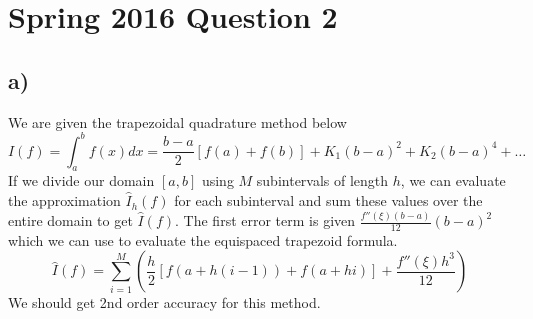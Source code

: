 \documentclass[12pt]{article}
\begin{document}
\section*{Spring 2016 Question 2}

\subsection*{a)} 
We are given the trapezoidal quadrature method below
\begin{equation*}
I(f) = \int_a^b f(x) dx = \dfrac{b-a}{2} \left[f(a) + f(b)\right] + K_1(b-a)^2 + K_2(b-a)^4 + \dots
\end{equation*}
If we divide our domain $[a,b]$ using $M$ subintervals of length $h$, we can evaluate the approximation $\hat{I}_h(f)$ for each subinterval and sum these values over the entire domain to get $\hat{I}(f)$. The first error term is given $\frac{f''(\xi)(b-a)}{12}(b-a)^2$ which we can use to evaluate the equispaced trapezoid formula.
\begin{equation*}
\hat{I}(f) = \sum_{i=1}^{M} \left( \dfrac{h}{2} \left[f(a+h(i-1)) + f(a+hi)\right] + \dfrac{f''(\xi)h^3}{12} \right)
\end{equation*}
We should get 2nd order accuracy for this method.
\end{document}
